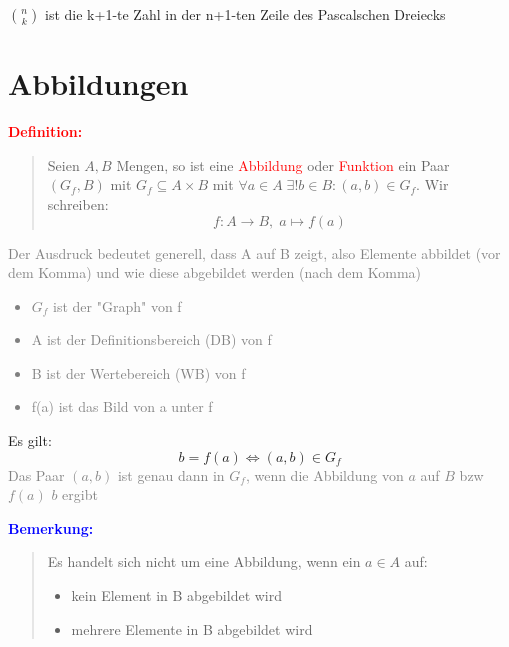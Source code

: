 \documentclass{article}
\newcommand{\red}[1]{\textcolor{red}{#1}}
\newcommand{\gray}[1]{\textcolor{gray}{#1}}
\newcommand{\blue}[1]{\textcolor{blue}{#1}}
\newcommand{\de}[1]{\red{\textbf{Definition: }}\begin{quote}#1\end{quote}}
\newcommand{\an}[1]{\blue{\textbf{Bemerkung: }}\begin{quote}#1\end{quote}}
\newcommand{\n}[1]{\overline{#1}}
\begin{document}
\begin{center}
\end{center}

\begin{center}
    $\binom{n}{k}$ ist die k+1-te Zahl in der n+1-ten Zeile des Pascalschen Dreiecks
\end{center}

\newpage
\section{Abbildungen}

\de{Seien $A, B$ Mengen, so ist eine \red{Abbildung} oder \red{Funktion} ein Paar $(G_f, B)$ mit $G_f \subseteq A \times B$ mit $\forall a \in A \; \exists! b \in B: (a, b) \in G_f$. Wir schreiben:
\begin{equation*}
    f: A \to B, \; a \mapsto f(a)
\end{equation*}
}

\gray{Der Ausdruck bedeutet generell, dass A auf B zeigt, also Elemente abbildet (vor dem Komma) und wie diese abgebildet werden (nach dem Komma)}
\gray{
    \begin{itemize}
        \item $G_f$ ist der "Graph" von f
        \item A ist der Definitionsbereich (DB) von f
        \item B ist der Wertebereich (WB) von f
        \item f(a) ist das Bild von a unter f
    \end{itemize}
}
Es gilt:
\begin{equation*}
    b = f(a) \iff (a, b) \in G_f   
\end{equation*}
\gray{Das Paar $(a, b)$ ist genau dann in $G_f$, wenn die Abbildung von $a$ auf $B$ bzw $f(a)$ $b$ ergibt}

\an{
    Es handelt sich nicht um eine Abbildung, wenn ein $a \in A$ auf:
    \begin{itemize}
        \item kein Element in B abgebildet wird
        \item mehrere Elemente in B abgebildet wird
    \end{itemize}
}
\end{document}
